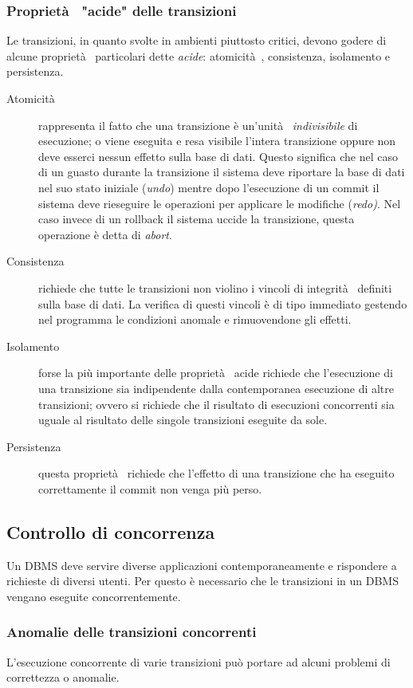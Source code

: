 \subsubsection{Proprietà  "acide" delle transizioni}
Le transizioni, in quanto svolte in ambienti piuttosto critici, devono godere di alcune proprietà  particolari dette \emph{acide}: atomicità , consistenza, isolamento e persistenza.
\begin{description}
    \item[Atomicità ] rappresenta il fatto che una transizione è un'unità  \emph{indivisibile} di esecuzione; o viene eseguita e resa visibile l'intera transizione oppure non deve esserci nessun effetto sulla base di dati.
Questo significa che nel caso di un guasto durante la transizione il sistema deve riportare la base di dati nel suo stato iniziale (\emph{undo}) mentre dopo l'esecuzione di un commit il sistema deve rieseguire le operazioni per applicare le modifiche (\emph{redo)}. Nel caso invece di un rollback il sistema uccide la transizione, questa operazione è detta di \emph{abort}.\\
	\item[Consistenza] richiede che tutte le transizioni non violino i vincoli di integrità  definiti sulla base di dati. La verifica di questi vincoli è di tipo immediato gestendo nel programma le condizioni anomale e rimuovendone gli effetti.\\
	\item[Isolamento] forse la più importante delle proprietà  acide richiede che l'esecuzione di una transizione sia indipendente dalla contemporanea esecuzione di altre transizioni; ovvero si richiede che il risultato di esecuzioni concorrenti sia uguale al risultato delle singole transizioni eseguite da sole.\\
	\item[Persistenza] questa proprietà  richiede che l'effetto di una transizione che ha eseguito correttamente il commit non venga più perso.
\end{description}

\subsection{Controllo di concorrenza}
Un DBMS deve servire diverse applicazioni contemporaneamente e rispondere a richieste di diversi utenti. Per questo è necessario che le transizioni in un DBMS vengano eseguite concorrentemente.
\subsubsection{Anomalie delle transizioni concorrenti}
L'esecuzione concorrente di varie transizioni può portare ad alcuni problemi di correttezza o anomalie.
